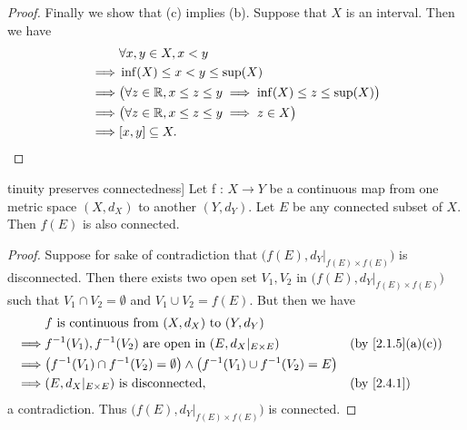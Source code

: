 \begin{proof}
  Finally we show that (c) implies (b).
  Suppose that \(X\) is an interval.
  Then we have
  \begin{align*}
             & \forall x, y \in X, x < y                                                        \\
    \implies & \inf(X) \leq x < y \leq \sup(X)                                                  \\
    \implies & \big(\forall z \in \mathbb{R}, x \leq z \leq y \implies \inf(X) \leq z \leq \sup(X)\big) \\
    \implies & \big(\forall z \in \mathbb{R}, x \leq z \leq y \implies z \in X\big)                     \\
    \implies & [x, y] \subseteq X.
  \end{align*}
\end{proof}

\begin{thm}tinuity preserves connectedness]\label{2.4.6}
  Let f : \(X \to Y\) be a continuous map from one metric space \((X, d_X)\) to another \((Y, d_Y)\).
  Let \(E\) be any connected subset of \(X\).
  Then \(f(E)\) is also connected.
\end{thm}

\begin{proof}
  Suppose for sake of contradiction that \(\big(f(E), d_Y|_{f(E) \times f(E)}\big)\) is disconnected.
  Then there exists two open set \(V_1, V_2\) in \(\big(f(E), d_Y|_{f(E) \times f(E)}\big)\) such that \(V_1 \cap V_2 = \emptyset\) and \(V_1 \cup V_2 = f(E)\).
  But then we have
  \begin{align*}
             & f \text{ is continuous from } (X, d_X) \text{ to } (Y, d_Y)                                                                             \\
    \implies & f^{-1}(V_1), f^{-1}(V_2) \text{ are open in } (E, d_X|_{E \times E})                                &  & \text{(by \cref{2.1.5}(a)(c))} \\
    \implies & \big(f^{-1}(V_1) \cap f^{-1}(V_2) = \emptyset\big) \land \big(f^{-1}(V_1) \cup f^{-1}(V_2) = E\big)                                     \\
    \implies & (E, d_X|_{E \times E}) \text{ is disconnected},                                                     &  & \text{(by \cref{2.4.1})}
  \end{align*}
  a contradiction.
  Thus \(\big(f(E), d_Y|_{f(E) \times f(E)}\big)\) is connected.
\end{proof}

